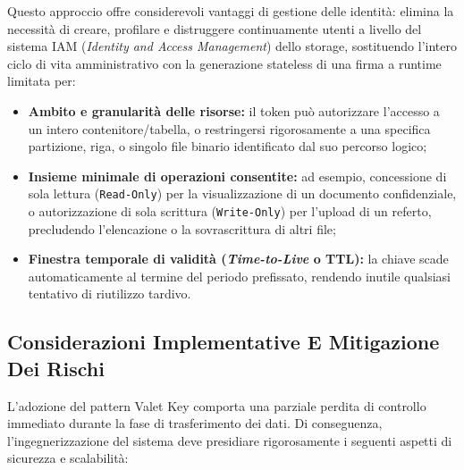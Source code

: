 \documentclass[11pt, a4paper]{article}
\begin{document}
Questo approccio offre considerevoli vantaggi di gestione delle identità: elimina la necessità di creare, profilare e distruggere continuamente utenti a livello del sistema IAM (\emph{Identity and Access Management}) dello storage, sostituendo l'intero ciclo di vita amministrativo con la generazione stateless di una firma a runtime limitata per:
\begin{itemize}[noitemsep]
    \item \textbf{Ambito e granularità delle risorse:} il token può autorizzare l'accesso a un intero contenitore/tabella, o restringersi rigorosamente a una specifica partizione, riga, o singolo file binario identificato dal suo percorso logico;
    \item \textbf{Insieme minimale di operazioni consentite:} ad esempio, concessione di sola lettura (\texttt{Read-Only}) per la visualizzazione di un documento confidenziale, o autorizzazione di sola scrittura (\texttt{Write-Only}) per l'upload di un referto, precludendo l'elencazione o la sovrascrittura di altri file;
    \item \textbf{Finestra temporale di validità (\emph{Time-to-Live} o TTL):} la chiave scade automaticamente al termine del periodo prefissato, rendendo inutile qualsiasi tentativo di riutilizzo tardivo.
\end{itemize}

\subsection{Considerazioni Implementative E Mitigazione Dei Rischi}

L'adozione del pattern Valet Key comporta una parziale perdita di controllo immediato durante la fase di trasferimento dei dati. Di conseguenza, l'ingegnerizzazione del sistema deve presidiare rigorosamente i seguenti aspetti di sicurezza e scalabilità:
\end{document}
